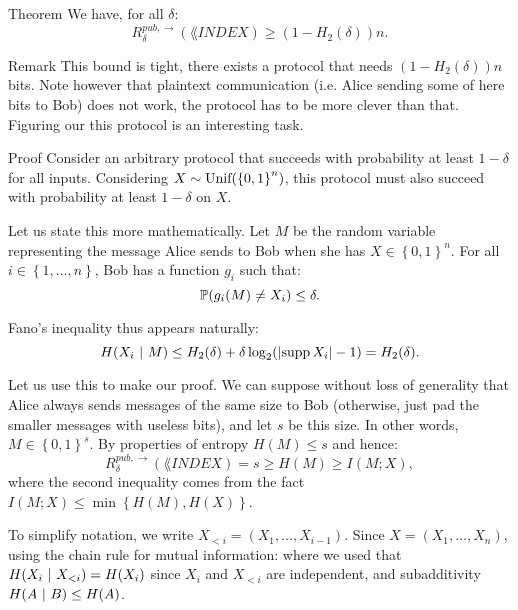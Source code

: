 \documentclass[a4paper]{article}
\begin{document}
\begin{parag}{Theorem}
    We have, for all $\delta$: 
    \[R_{\delta}^{pub, \to}\left(\lang{INDEX}\right) \geq \left(1 - H_2\left(\delta\right)\right)n.\]

    \begin{subparag}{Remark}
        This bound is tight, there exists a protocol that needs $\left(1 - H_2\left(\delta\right)\right)n$ bits. Note however that plaintext communication (i.e. Alice sending some of here bits to Bob) does not work, the protocol has to be more clever than that. Figuring our this protocol is an interesting task.
    \end{subparag}
    
    \begin{subparag}{Proof}
        Consider an arbitrary protocol that succeeds with probability at least $1 - \delta$ for all inputs. Considering $X \followsdistr \text{Unif}\left(\left\{0, 1\right\}^n\right)$, this protocol must also succeed with probability at least $1 - \delta$ on $X$.

        Let us state this more mathematically. Let $M$ be the random variable representing the message Alice sends to Bob when she has $X \in \left\{0, 1\right\}^n$. For all $i \in \left\{1, \ldots, n\right\}$, Bob has a function $g_i$ such that: 
        \[\prob\left(g_i\left(M\right) \neq X_i\right) \leq \delta.\]
        
        Fano's inequality thus appears naturally: 
        \[H\left(X_i \suchthat M\right) \leq H_2\left(\delta\right) + \delta \log_2\left(\left|\supp X_i\right| - 1\right) = H_2\left(\delta\right).\]

        Let us use this to make our proof. We can suppose without loss of generality that Alice always sends messages of the same size to Bob (otherwise, just pad the smaller messages with useless bits), and let $s$ be this size. In other words, $M \in \left\{0, 1\right\}^s$. By properties of entropy $H\left(M\right) \leq s$ and hence: 
        \[R_{\delta}^{pub, \to}\left(\lang{INDEX}\right) = s \geq H\left(M\right) \geq I\left(M; X\right),\]
        where the second inequality comes from the fact $I\left(M; X\right) \leq \min\left\{H\left(M\right), H\left(X\right)\right\}$.

        To simplify notation, we write $X_{< i} = \left(X_1, \ldots, X_{i-1}\right)$. Since $X = \left(X_1, \ldots, X_n\right)$, using the chain rule for mutual information:
        where we used that $H\left(X_i \suchthat X_{< i}\right) = H\left(X_i\right)$ since $X_i$ and $X_{<i}$ are independent, and subadditivity $H\left(A \suchthat B\right) \leq H\left(A\right)$.


\end{subparag}
\end{parag}
\end{document}
